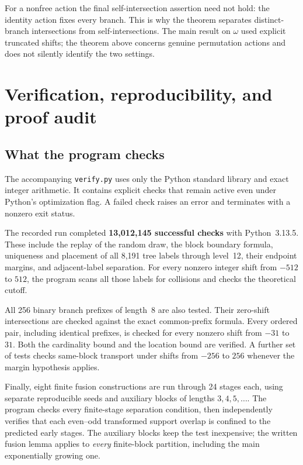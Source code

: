 \documentclass[11pt,a4paper]{article}
\theoremstyle{definition}
\theoremstyle{remark}
\begin{document}
For a nonfree action the final self-intersection assertion need not
hold: the identity action fixes every branch. This is why the theorem
separates distinct-branch intersections from self-intersections. The
main result on $\omega$ used explicit truncated shifts; the theorem
above concerns genuine permutation actions and does not silently
identify the two settings.

\section{Verification, reproducibility, and proof audit}
\label{sec:verification}

\subsection{What the program checks}
The accompanying \texttt{verify.py} uses only the Python standard
library and exact integer arithmetic. It contains explicit checks that
remain active even under Python's optimization flag. A failed check
raises an error and terminates with a nonzero exit status.

The recorded run completed \textbf{13,012,145 successful checks} with
Python~3.13.5. These include the replay of the random draw, the block
boundary formula, uniqueness and placement of all 8,191 tree labels
through level~12, their endpoint margins, and adjacent-label separation.
For every nonzero integer shift from $-512$ to $512$, the program scans
all those labels for collisions and checks the theoretical cutoff.

All 256 binary branch prefixes of length~8 are also tested. Their
zero-shift intersections are checked against the exact common-prefix
formula. Every ordered pair, including identical prefixes, is checked
for every nonzero shift from $-31$ to $31$. Both the cardinality bound
and the location bound are verified. A further set of tests checks
same-block transport under shifts from $-256$ to $256$ whenever the
margin hypothesis applies.

Finally, eight finite fusion constructions are run through 24 stages
each, using separate reproducible seeds and auxiliary blocks of lengths
$3,4,5,\ldots$. The program checks every finite-stage separation
condition, then independently verifies that each even--odd transformed
support overlap is confined to the predicted early stages. The
auxiliary blocks keep the test inexpensive; the written fusion lemma
applies to \emph{every} finite-block partition, including the main
exponentially growing one.
\end{document}
